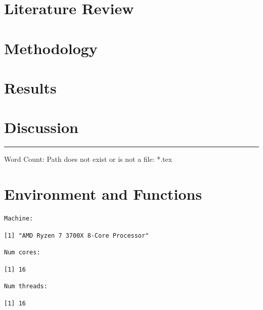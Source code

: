 \documentclass[a4paper, notitlepage]{extreport}
\begin{document}
\chapter{Literature Review}

\lipsum
\chapter{Methodology}

\lipsum
\chapter{Results}

\lipsum
\chapter{Discussion}

\lipsum

\nocite{tidyverse,devtools,ggthemes,kableExtra,scales,cowplot,bibtex,benchmarkme,showtext,data.table}
\noindent

\rule{2cm}{0.4pt}

Word Count: Path does not exist or is not a file: *.tex


\linespread{1}


\appendix
\chapter{Environment and Functions}

\begin{verbatim}
Machine:     
\end{verbatim}

\begin{verbatim}
[1] "AMD Ryzen 7 3700X 8-Core Processor"
\end{verbatim}

\begin{verbatim}
Num cores:   
\end{verbatim}

\begin{verbatim}
[1] 16
\end{verbatim}

\begin{verbatim}
Num threads: 
\end{verbatim}

\begin{verbatim}
[1] 16
\end{verbatim}
\end{document}
